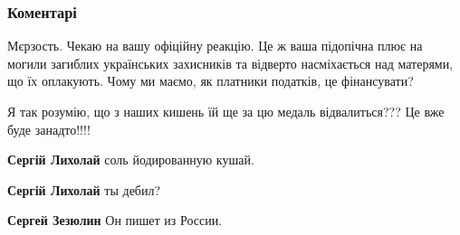  
 
 
 
 
\subsubsection{Коментарі}


\begin{itemize}


Мєрзость. Чекаю на вашу офіційну реакцію. Це ж ваша підопічна плює на могили
загиблих українських захисників та відверто насміхається над матерями, що їх
оплакують. Чому ми маємо, як платники податків, це фінансувати?

Я так розумію, що з наших кишень їй ще за цю медаль відвалиться??? Це вже буде
занадто!!!!

\begin{itemize}
 
\textbf{Сергій Лихолай} соль йодированную кушай.

 
\textbf{Сергій Лихолай} ты дебил?

\begin{itemize}

 
\textbf{Сергей Зезюлин} Он пишет из России.

 

\end{itemize}
\end{itemize}
\end{itemize}
